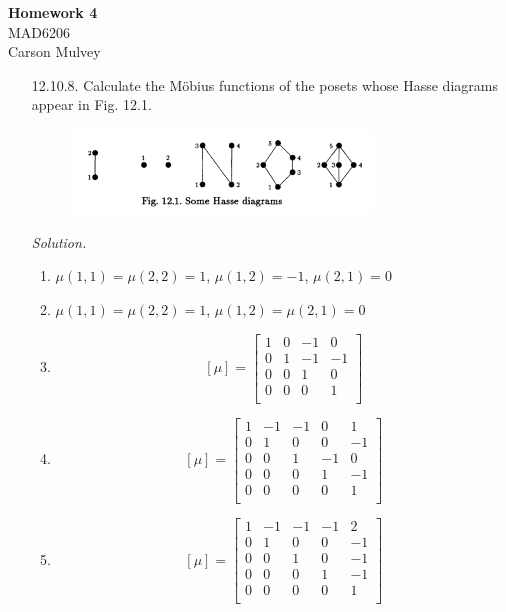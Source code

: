 \documentclass[11pt,letterpaper]{article}
\newenvironment{solution}{\color{Violet}\textit{Solution.}}{\color{black}}
\begin{document}
\begin{center}
    \begin{large}
        \textbf{Homework 4} \\
        MAD6206 \\
        Carson Mulvey
    \end{large}
\end{center}

\color{black}

\begin{enumerate}
    \item[12.10.8.] Calculate the Möbius functions of the posets whose Hasse diagrams appear in Fig. 12.1.
    \begin{figure}[h]
        \centering
        \includegraphics[width=8cm]{figure.png}
    \end{figure}
    
    \begin{solution}
        \begin{enumerate}
            \item $\mu(1,1) = \mu(2,2) = 1$, $\mu(1,2) = -1$, $\mu(2,1) = 0$
            \item $\mu(1,1) = \mu(2,2) = 1$, $\mu(1,2) = \mu(2,1) = 0$
            \item \[[\mu] = \left[ {\begin{array}{cccc}
                1 & 0 & -1 & 0\\
                0 & 1 & -1 & -1\\
                0 & 0 & 1 & 0\\
                0 & 0 & 0 & 1\\
  \end{array} } \right]\]
            \item \[[\mu] = \left[ {\begin{array}{ccccc}
                1 & -1 & -1 & 0 & 1\\
                0 & 1 & 0 & 0 & -1\\
                0 & 0 & 1 & -1 & 0\\
                0 & 0 & 0 & 1 & -1\\
                0 & 0 & 0 & 0 & 1\\
  \end{array} } \right]\]
  \item \[[\mu] = \left[ {\begin{array}{ccccc}
    1 & -1 & -1 & -1 & 2\\
    0 & 1 & 0 & 0 & -1\\
    0 & 0 & 1 & 0 & -1\\
    0 & 0 & 0 & 1 & -1\\
    0 & 0 & 0 & 0 & 1\\
  \end{array} } \right]\]
        \end{enumerate}
    \end{solution}


\end{enumerate}
\end{document}

